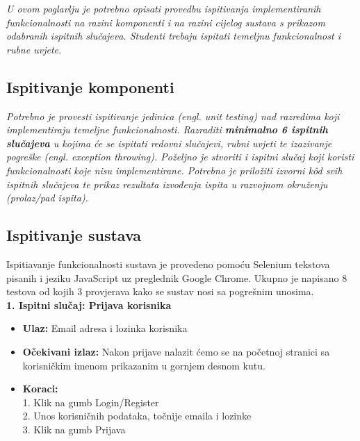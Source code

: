 			 \textit{U ovom poglavlju je potrebno opisati provedbu ispitivanja implementiranih funkcionalnosti na razini komponenti i na razini cijelog sustava s prikazom odabranih ispitnih slučajeva. Studenti trebaju ispitati temeljnu funkcionalnost i rubne uvjete.}
	
			
			\subsection{Ispitivanje komponenti}
			\textit{Potrebno je provesti ispitivanje jedinica (engl. unit testing) nad razredima koji implementiraju temeljne funkcionalnosti. Razraditi \textbf{minimalno 6 ispitnih slučajeva} u kojima će se ispitati redovni slučajevi, rubni uvjeti te izazivanje pogreške (engl. exception throwing). Poželjno je stvoriti i ispitni slučaj koji koristi funkcionalnosti koje nisu implementirane. Potrebno je priložiti izvorni kôd svih ispitnih slučajeva te prikaz rezultata izvođenja ispita u razvojnom okruženju (prolaz/pad ispita). }
			
			
			
			\subsection{Ispitivanje sustava}

			Ispitiavanje funkcionalnosti sustava je provedeno pomoću Selenium tekstova
			pisanih i jeziku JavaScript uz preglednik Google Chrome. Ukupno je napisano
			8 testova od kojih 3 provjerava kako se sustav nosi sa pogrešnim unosima.
			 \\
			\textbf{1. Ispitni slučaj: Prijava korisnika}
			 \begin{itemize}
				\item \textbf{Ulaz:} Email adresa i lozinka korisnika 
				\item \textbf{Očekivani izlaz:} Nakon prijave nalazit ćemo se na početnoj stranici sa korisničkim imenom prikazanim u gornjem desnom kutu.
				\item \textbf{Koraci:} 
				\\ 1. Klik na gumb Login/Register
				\\ 2. Unos korisničnih podataka, točnije emaila i lozinke
				\\ 3. Klik na gumb Prijava
			\end{itemize}


